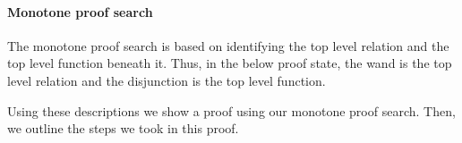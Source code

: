 \documentclass[thesis.tex]{subfiles}
\begin{document}
\paragraph*{Monotone proof search}
The monotone proof search is based on identifying the top level relation and the top level function beneath it. Thus, in the below proof state, the wand is the top level relation and the disjunction is the top level function.
\begin{center}
\end{center}
Using these descriptions we show a proof using our monotone proof search. Then, we outline the steps we took in this proof.
\end{document}
